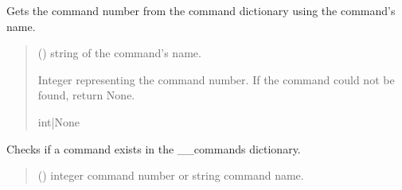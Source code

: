 \documentclass[letterpaper,10pt,english]{sphinxmanual}
\begin{document}
\begin{fulllineitems}
\begin{fulllineitems}
\end{fulllineitems}


\begin{fulllineitems}
\label{\detokenize{PodCommands:PodCommands.POD_Commands.CommandNumberFromName}}
\pysigstartsignatures
{}
\pysigstopsignatures
\sphinxAtStartPar
Gets the command number from the command dictionary using the command’s name.
\begin{quote}\begin{description}
\sphinxAtStartPar
{} () \textendash{} string of the command’s name.

\sphinxAtStartPar
Integer representing the command number. If the command could not be found,                 return None.

\sphinxAtStartPar
int|None

\end{description}\end{quote}

\end{fulllineitems}


\begin{fulllineitems}
\label{\detokenize{PodCommands:PodCommands.POD_Commands.DoesCommandExist}}
\pysigstartsignatures
{}
\pysigstopsignatures
\sphinxAtStartPar
Checks if a command exists in the \_\_commands dictionary.
\begin{quote}\begin{description}
\sphinxAtStartPar
{} (\sphinxstyleliteralemphasis{\sphinxupquote{ | }}) \textendash{} integer command number or string command name.


\end{description}
\end{quote}
\end{fulllineitems}
\end{fulllineitems}
\end{document}
